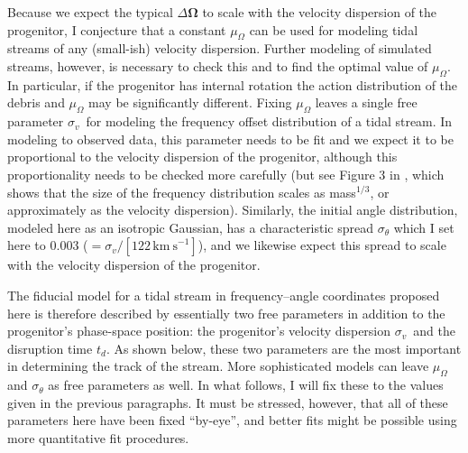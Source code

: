 \documentclass{emulateapj}
\renewcommand{\vec}[1]{\ensuremath{\mathbf{#1}}}
\newcommand{\veco}{\ensuremath{\vec{\Omega}}}
\newcommand{\sigv}{\ensuremath{\sigma_v}}
\newcommand{\kms}{\ensuremath{\,\mathrm{km\ s}^{-1}}}
\begin{document}
Because we expect the typical $\Delta\veco$ to scale with the velocity
dispersion of the progenitor, I conjecture that a constant
$\mu_\Omega$ can be used for modeling tidal streams of any (small-ish)
velocity dispersion. Further modeling of simulated streams, however,
is necessary to check this and to find the optimal value of
$\mu_\Omega$. In particular, if the progenitor has internal rotation
the action distribution of the debris and $\mu_\Omega$ may be
significantly different. Fixing $\mu_\Omega$ leaves a single free
parameter \sigv\ for modeling the frequency offset distribution of a
tidal stream. In modeling to observed data, this parameter needs to be
fit and we expect it to be proportional to the velocity dispersion of
the progenitor, although this proportionality needs to be checked more
carefully (but see Figure 3 in \citealt{Sanders13a}, which shows that
the size of the frequency distribution scales as mass$^{1/3}$, or
approximately as the velocity dispersion). Similarly, the initial
angle distribution, modeled here as an isotropic Gaussian, has a
characteristic spread $\sigma_{\theta}$ which I set here to $0.003$
($=\sigv/[122\kms]$), and we likewise expect this spread to scale with
the velocity dispersion of the progenitor.

The fiducial model for a tidal stream in frequency--angle coordinates
proposed here is therefore described by essentially two free
parameters in addition to the progenitor's phase-space position: the
progenitor's velocity dispersion \sigv\ and the disruption time
$t_d$. As shown below, these two parameters are the most important in
determining the track of the stream. More sophisticated models can
leave $\mu_\Omega$ and $\sigma_{\theta}$ as free parameters as
well. In what follows, I will fix these to the values given in the
previous paragraphs. It must be stressed, however, that all of these
parameters here have been fixed ``by-eye'', and better fits might be
possible using more quantitative fit procedures.
\end{document}
